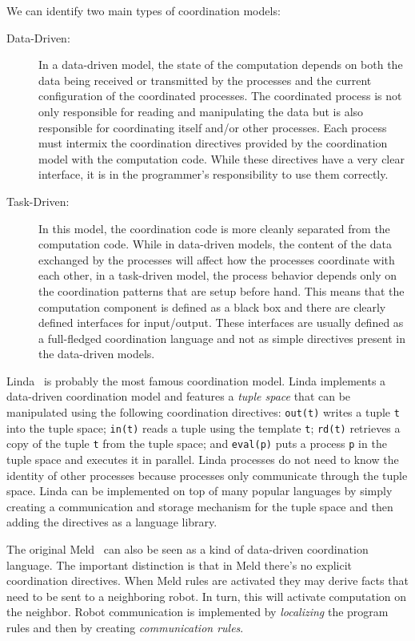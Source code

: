 We can identify two main types of coordination models:

\begin{description}
   \item[Data-Driven:] In a data-driven model,
the state of the computation depends on both the data being received or transmitted by the processes and the current configuration
of the coordinated processes. The coordinated process is not only responsible for reading and manipulating the data but is also
responsible for coordinating itself and/or other processes. Each process must intermix the coordination directives provided by the coordination
model with the computation code. While these directives have a very clear interface, it is in the programmer's responsibility to use them correctly.

   \item[Task-Driven:] In this model, the coordination code is more cleanly separated from the computation code. While in data-driven models, the content of the data exchanged by the processes will affect how the processes coordinate with each other, in a task-driven model, the process behavior depends only on the coordination patterns that are setup before hand. This means that the computation component is defined as a black box and there are clearly defined interfaces for input/output. These interfaces are usually defined as a full-fledged coordination language and not as
   simple directives present in the data-driven models.
\end{description}

Linda~\cite{linda} is probably the most famous coordination model. Linda implements a data-driven coordination model
and features a \emph{tuple space} that can be manipulated using the following coordination directives: \texttt{out(t)}
writes a tuple \texttt{t} into the tuple space; \texttt{in(t)} reads a tuple using the template \texttt{t}; \texttt{rd(t)} retrieves
a copy of the tuple \texttt{t} from the tuple space; and \texttt{eval(p)} puts a process \texttt{p} in the tuple space and executes it in parallel.
Linda processes do not need to know the identity of other processes because processes only communicate through the tuple space.
Linda can be implemented on top of many popular languages by simply creating a communication and storage mechanism for the tuple space
and then adding the directives as a language library.

The original Meld~\cite{ashley-rollman-iclp09} can also be seen as a kind of data-driven coordination language. The important distinction is that
in Meld there's no explicit coordination directives. When Meld rules are activated they may derive facts that need to be sent to a neighboring robot. In turn, this will activate computation on the neighbor. Robot communication is implemented by \emph{localizing} the program rules
and then by creating \emph{communication rules}.

